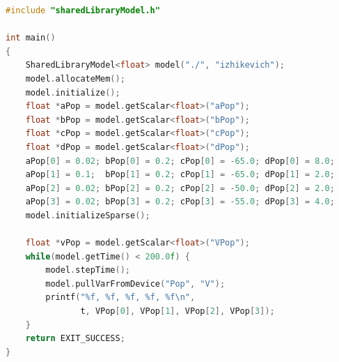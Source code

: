 \documentclass[utf8]{frontiersSCNS} %
\begin{document}
%
\begin{lstlisting}[language=C++]
#include "sharedLibraryModel.h"

int main()
{
    SharedLibraryModel<float> model("./", "izhikevich");
    model.allocateMem();
    model.initialize();
    float *aPop = model.getScalar<float>("aPop");
    float *bPop = model.getScalar<float>("bPop");
    float *cPop = model.getScalar<float>("cPop");
    float *dPop = model.getScalar<float>("dPop");
    aPop[0] = 0.02; bPop[0] = 0.2; cPop[0] = -65.0; dPop[0] = 8.0;
    aPop[1] = 0.1;  bPop[1] = 0.2; cPop[1] = -65.0; dPop[1] = 2.0;
    aPop[2] = 0.02; bPop[2] = 0.2; cPop[2] = -50.0; dPop[2] = 2.0;
    aPop[3] = 0.02; bPop[3] = 0.2; cPop[3] = -55.0; dPop[3] = 4.0;
    model.initializeSparse();

    float *vPop = model.getScalar<float>("VPop");
    while(model.getTime() < 200.0f) {
        model.stepTime();
        model.pullVarFromDevice("Pop", "V");
        printf("%f, %f, %f, %f, %f\n", 
               t, VPop[0], VPop[1], VPop[2], VPop[3]);
    }
    return EXIT_SUCCESS;
}
\end{lstlisting}
\end{document}

